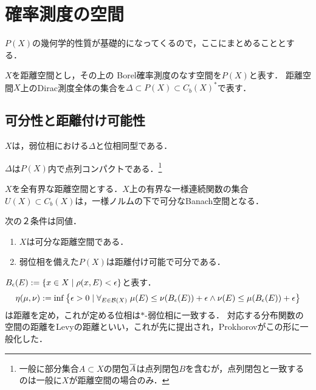 \documentclass[uplatex,dvipdfmx]{jsreport}
\begin{document}
\section{確率測度の空間}

\begin{tcolorbox}[colframe=ForestGreen, colback=ForestGreen!10!white,breakable,colbacktitle=ForestGreen!40!white,coltitle=black,fonttitle=\bfseries\sffamily,
title=]
    $P(X)$の幾何学的性質が基礎的になってくるので，ここにまとめることとする．
\end{tcolorbox}

\begin{notation}
    $X$を距離空間とし，その上の
    Borel確率測度のなす空間を$P(X)$と表す．
    距離空間$X$上のDirac測度全体の集合を$\Delta\subset P(X)\subset C_b(X)^*$で表す．
\end{notation}

\subsection{可分性と距離付け可能性}

\begin{lemma}
    $X$は，弱位相における$\Delta$と位相同型である．
\end{lemma}

\begin{lemma}
    $\Delta$は$P(X)$内で点列コンパクトである．\footnote{一般に部分集合$A\subset X$の閉包$\overline{A}$は点列閉包$B$を含むが，点列閉包と一致するのは一般に$X$が距離空間の場合のみ．}
\end{lemma}

\begin{lemma}
    $X$を全有界な距離空間とする．$X$上の有界な一様連続関数の集合$U(X)\subset C_b(X)$は，一様ノルムの下で可分なBanach空間となる．
\end{lemma}

\begin{theorem}[確率測度の空間の弱位相の距離化可能性]\label{thm-metrizability-of-P(X)-in-weak-topology}
    次の２条件は同値．
    \begin{enumerate}
        \item $X$は可分な距離空間である．
        \item 弱位相を備えた$P(X)$は距離付け可能で可分である．
    \end{enumerate}
\end{theorem}

\begin{example}
    $B_\epsilon(E):=\{x\in X\mid\rho(x,E)<\epsilon\}$と表す．
    \[\eta(\mu,\nu):=\inf\left\{\epsilon>0\mid\forall_{E\in\mathcal{B}(X)}\;\mu(E)\le\nu(B_\epsilon(E))+\epsilon\land\nu(E)\le\mu(B_\epsilon(E))+\epsilon\right\}\]
    は距離を定め，これが定める位相は$*$-弱位相に一致する．
    対応する分布関数の空間の距離をLevyの距離といい，これが先に提出され，Prokhorovがこの形に一般化した．
\end{example}
\end{document}
